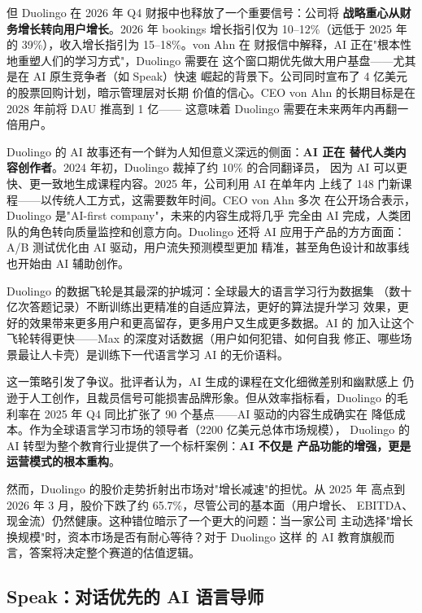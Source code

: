 但 Duolingo 在 2026 年 Q4 财报中也释放了一个重要信号：公司将
\textbf{战略重心从财务增长转向用户增长}。2026 年 bookings 增长指引仅为
10--12\%（远低于 2025 年的 39\%），收入增长指引为 15--18\%。von Ahn 在
财报信中解释，AI 正在"根本性地重塑人们的学习方式"，Duolingo 需要在
这个窗口期优先做大用户基盘——尤其是在 AI 原生竞争者（如 Speak）快速
崛起的背景下。公司同时宣布了 4 亿美元的股票回购计划，暗示管理层对长期
价值的信心。CEO von Ahn 的长期目标是在 2028 年前将 DAU 推高到 1 亿——
这意味着 Duolingo 需要在未来两年内再翻一倍用户。

Duolingo 的 AI 故事还有一个鲜为人知但意义深远的侧面：\textbf{AI 正在
替代人类内容创作者}。2024 年初，Duolingo 裁掉了约 10\% 的合同翻译员，
因为 AI 可以更快、更一致地生成课程内容。2025 年，公司利用 AI 在单年内
上线了 148 门新课程——以传统人工方式，这需要数年时间。CEO von Ahn 多次
在公开场合表示，Duolingo 是"AI-first company"，未来的内容生成将几乎
完全由 AI 完成，人类团队的角色转向质量监控和创意方向。Duolingo 还将 AI
应用于产品的方方面面：A/B 测试优化由 AI 驱动，用户流失预测模型更加
精准，甚至角色设计和故事线也开始由 AI 辅助创作。

Duolingo 的数据飞轮是其最深的护城河：全球最大的语言学习行为数据集
（数十亿次答题记录）不断训练出更精准的自适应算法，更好的算法提升学习
效果，更好的效果带来更多用户和更高留存，更多用户又生成更多数据。AI 的
加入让这个飞轮转得更快——Max 的深度对话数据（用户如何犯错、如何自我
修正、哪些场景最让人卡壳）是训练下一代语言学习 AI 的无价语料。

这一策略引发了争议。批评者认为，AI 生成的课程在文化细微差别和幽默感上
仍逊于人工创作，且裁员信号可能损害品牌形象。但从效率指标看，Duolingo
的毛利率在 2025 年 Q4 同比扩张了 90 个基点——AI 驱动的内容生成确实在
降低成本。作为全球语言学习市场的领导者（2200 亿美元总体市场规模），
Duolingo 的 AI 转型为整个教育行业提供了一个标杆案例：\textbf{AI 不仅是
产品功能的增强，更是运营模式的根本重构}。

然而，Duolingo 的股价走势折射出市场对"增长减速"的担忧。从 2025 年
高点到 2026 年 3 月，股价下跌了约 65.7\%，尽管公司的基本面（用户增长、
EBITDA、现金流）仍然健康。这种错位暗示了一个更大的问题：当一家公司
主动选择"增长换规模"时，资本市场是否有耐心等待？对于 Duolingo 这样
的 AI 教育旗舰而言，答案将决定整个赛道的估值逻辑。


\subsection{Speak：对话优先的 AI 语言导师}
\label{subsec:speak}

